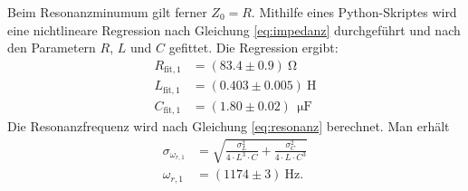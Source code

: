 \documentclass[12pt,a4paper,titlepage,headinclude]{scrartcl}
\numberwithin{equation}{subsection}
\newcommand{\mrm}[1]{\mathrm{#1}}
\begin{document}
Beim Resonanzminumum gilt ferner $Z_0=R$. Mithilfe eines Python-Skriptes wird eine nichtlineare Regression nach Gleichung \eqref{eq:impedanz} durchgeführt und nach den Parametern $R$, $L$ und $C$ gefittet. Die Regression ergibt:
\begin{align}
	R_{\mrm{fit},1}&=(83.4\pm0.9)~\mrm{\Omega}
	\label{eq:Rfit1}\\
	L_{\mrm{fit},1}&=(0.403\pm0.005)~\mrm{H}
	\label{eq:Lfit1}\\
	C_{\mrm{fit},1}&=(1.80\pm0.02)~\SI{}{\micro\farad}
	\label{eq:Cfit1}
\end{align}
Die Resonanzfrequenz wird nach Gleichung \eqref{eq:resonanz} berechnet. Man erhält
\begin{align}
	\sigma_{\omega_{r,1}}&=\sqrt{\frac{\sigma_L^2}{4\cdot L^3\cdot C}+\frac{\sigma_C^2}{4\cdot L\cdot C^3}}
	\label{eq:sigmaresonanzfrequenz1}\\
	\omega_{r,1}&=(1174 \pm 3)~\mrm{Hz}.\label{eq:resonanzfrequenz1}
\end{align}
\end{document}
